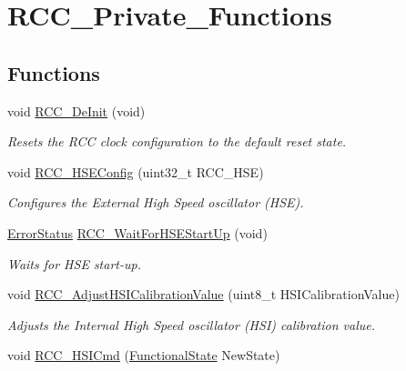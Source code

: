 \hypertarget{group___r_c_c___private___functions}{}\section{R\+C\+C\+\_\+\+Private\+\_\+\+Functions}
\label{group___r_c_c___private___functions}
\subsection*{Functions}
\begin{DoxyCompactItemize}
\item 
void \mbox{\hyperlink{group___r_c_c___private___functions_ga413f6422be11b1334abe60b3bff2e062}{R\+C\+C\+\_\+\+De\+Init}} (void)
\begin{DoxyCompactList}\small\item\em Resets the R\+CC clock configuration to the default reset state. \end{DoxyCompactList}\item 
void \mbox{\hyperlink{group___r_c_c___private___functions_ga432b3281546d23345642d55f8670a93d}{R\+C\+C\+\_\+\+H\+S\+E\+Config}} (uint32\+\_\+t R\+C\+C\+\_\+\+H\+SE)
\begin{DoxyCompactList}\small\item\em Configures the External High Speed oscillator (H\+SE). \end{DoxyCompactList}\item 
\mbox{\hyperlink{group___exported__types_ga8333b96c67f83cba354b3407fcbb6ee8}{Error\+Status}} \mbox{\hyperlink{group___r_c_c___private___functions_gae0f15692614dd048ee4110a056f001dc}{R\+C\+C\+\_\+\+Wait\+For\+H\+S\+E\+Start\+Up}} (void)
\begin{DoxyCompactList}\small\item\em Waits for H\+SE start-\/up. \end{DoxyCompactList}\item 
void \mbox{\hyperlink{group___r_c_c___private___functions_gaa2d6a35f5c2e0f86317c3beb222677fc}{R\+C\+C\+\_\+\+Adjust\+H\+S\+I\+Calibration\+Value}} (uint8\+\_\+t H\+S\+I\+Calibration\+Value)
\begin{DoxyCompactList}\small\item\em Adjusts the Internal High Speed oscillator (H\+SI) calibration value. \end{DoxyCompactList}\item 
void \mbox{\hyperlink{group___r_c_c___private___functions_ga0c6772a1e43765909495f57815ef69e2}{R\+C\+C\+\_\+\+H\+S\+I\+Cmd}} (\mbox{\hyperlink{group___exported__types_gac9a7e9a35d2513ec15c3b537aaa4fba1}{Functional\+State}} New\+State)

\end{DoxyCompactItemize}
